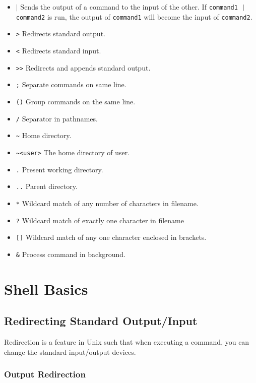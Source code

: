 \documentclass{report}
\begin{document}
       \begin{itemize}
         \item \textit{$|$} Sends the output of a command to the input of the other. If \texttt{command1 | command2} is run, the output of \texttt{command1} will become the input of \texttt{command2}.
         \item \texttt{>} Redirects standard output.
         \item \texttt{<} Redirects standard input.
         \item \texttt{>>} Redirects and appends standard output.
         \item \texttt{;} Separate commands on same line.
         \item \texttt{()} Group commands on the same line.
         \item \texttt{/} Separator in pathnames.
         \item \texttt{\textasciitilde} Home directory.
         \item \texttt{\textasciitilde<user>} The home directory of user.
         \item \texttt{.} Present working directory.
         \item \texttt{..} Parent directory.
         \item \texttt{*} Wildcard match of any number of characters in filename.
         \item \texttt{?} Wildcard match of exactly one character in filename
         \item \texttt{[]} Wildcard match of any one character enclosed in brackets.
         \item \texttt{\&} Process command in background.
       \end{itemize}

       \section{Shell Basics}
       \subsection{Redirecting Standard Output/Input}
       Redirection is a feature in Unix such that when executing a command, you can change the standard input/output devices.

       \subsubsection{Output Redirection}
\end{document}
